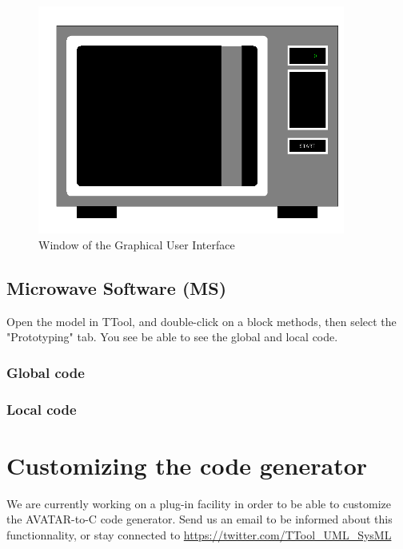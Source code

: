 \documentclass[12pt]{article}
\begin{document}
\begin{figure}[htbp]
\centering
\includegraphics[width=0.9\textwidth]{figures/gui1}
\caption{Window of the Graphical User Interface} \label{fig:gui1}
\end{figure}

\subsection{Microwave Software (MS)}
Open the model in TTool, and double-click on a block methods, then select the "Prototyping" tab. You see be able to see the global and local code.
\subsubsection{Global code}

\subsubsection{Local code}

\newpage
\section{Customizing the code generator}\label{sec:customgenerator}
We are currently working on a plug-in facility in order to be able to customize the AVATAR-to-C code generator. Send us an email to be informed about this functionnality, or stay connected to \url{https://twitter.com/TTool_UML_SysML}
\end{document}

